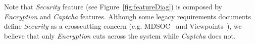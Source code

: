 \documentclass[11pt,twoside]{article}
\begin{document}

% 
% 
% 
% 
% 

Note that \textit{Security} feature (see Figure~\ref{fig:featureDiag}) is composed by \textit{Encryption} and \textit{Captcha} features.
Although some legacy requirements documents define \textit{Security} as a crosscutting concern
(e.g. MDSOC~\cite{hw-mdsoc} and Viewpoints~\cite{hw-viewpoints-v2}), we believe that only \textit{Encryption} cuts across the system
while \textit{Captcha} does not.


%
\end{document}
